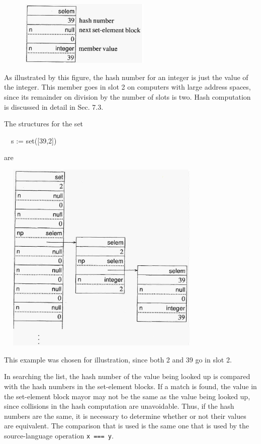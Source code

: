 \ \ \ \ \ \  \includegraphics[width=2.4575in,height=1.2217in]{ib-img/ib-img035.jpg} 

As illustrated by this figure, the hash number for an integer is just
the value of the integer. This member goes in slot 2 on computers with
large address spaces, since its remainder on division by the number of
slots is two. Hash computation is discussed in detail in Sec. 7.3.

The structures for the set

{\ttfamily\mdseries
\ \ s := set([39,2])}

\noindent are

\ \  \includegraphics[width=3.7402in,height=3.6366in]{ib-img/ib-img036.jpg} 

This example was chosen for illustration, since both 2 and 39 go in slot 2.

In searching the list, the hash number of the value being looked up is
compared with the hash numbers in the set-element blocks. If a match
is found, the value in the set-element block mayor may not be the same
as the value being looked up, since collisions in the hash computation
are unavoidable. Thus, if the hash numbers are the same, it is
necessary to determine whether or not their values are equivalent. The
comparison that is used is the same one that is used by the
source-language operation \texttt{x === y}.

